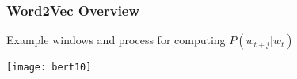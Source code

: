 \begin{frame}[fragile]\frametitle{Word2Vec Overview}
Example windows and process for computing  $P(w_{t+j}|w_t)$


\begin{center}
\texttt{[image: bert10]}
\end{center}	


\end{frame}















